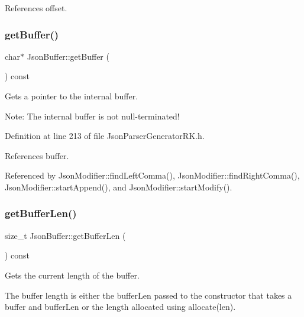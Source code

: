 References offset.

\mbox{\label{class_json_buffer_af8ca5014e0275487273f94c6b9223acf}} 
\subsubsection{\texorpdfstring{get\+Buffer()}{getBuffer()}}
{\footnotesize\ttfamily char$\ast$ Json\+Buffer\+::get\+Buffer (\begin{DoxyParamCaption}{ }\end{DoxyParamCaption}) const\hspace{0.3cm}{\ttfamily [inline]}}



Gets a pointer to the internal buffer. 

Note\+: The internal buffer is not null-\/terminated! 

Definition at line 213 of file Json\+Parser\+Generator\+R\+K.\+h.



References buffer.



Referenced by Json\+Modifier\+::find\+Left\+Comma(), Json\+Modifier\+::find\+Right\+Comma(), Json\+Modifier\+::start\+Append(), and Json\+Modifier\+::start\+Modify().

\mbox{\label{class_json_buffer_a486352be5658e94b9b9bd13563801e68}} 
\subsubsection{\texorpdfstring{get\+Buffer\+Len()}{getBufferLen()}}
{\footnotesize\ttfamily size\+\_\+t Json\+Buffer\+::get\+Buffer\+Len (\begin{DoxyParamCaption}{ }\end{DoxyParamCaption}) const\hspace{0.3cm}{\ttfamily [inline]}}



Gets the current length of the buffer. 

The buffer length is either the buffer\+Len passed to the constructor that takes a buffer and buffer\+Len or the length allocated using allocate(len). 

